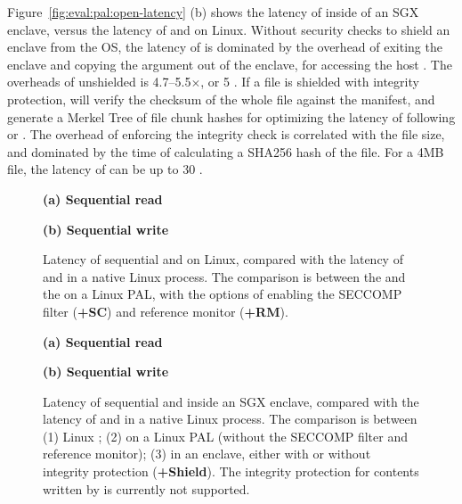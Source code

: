 Figure~\ref{fig:eval:pal:open-latency} (b) shows the latency of  inside of an SGX enclave, versus the latency of 
 and  on Linux.
Without security checks to shield an enclave from the OS,
the latency of  is dominated by the overhead of exiting the enclave and copying the argument out of the enclave,
for accessing the host \linuxapis{}.
The overheads of unshielded  is 4.7--5.5$\times$, or \roughly{}5 \usec{}.
If a file is shielded with integrity protection,
 will verify the checksum of the whole file against the manifest, and generate a Merkel Tree of file chunk hashes
for optimizing the latency of following  or .
The overhead of enforcing the integrity check is correlated with the file size, and dominated by the time of
calculating a SHA256 hash of the file.
For a 4MB file, the latency of  can be up to \roughly{}30 \msec{}.






\begin{figure*}[t!]
\centering
\footnotesize
{}
\parbox{0.49\textwidth}{\centering\bf (a) Sequential read}
\parbox{0.49\textwidth}{\centering\bf (b) Sequential write}
\caption{Latency of sequential  and  on Linux, compared with the latency of  and  \linuxapis{} in a native Linux process. The comparison is between the \linuxapis{} and the \hostapis{} on a Linux PAL,
with the options of enabling the SECCOMP filter ({\bf +SC})
and reference monitor ({\bf +RM}).}
\label{fig:eval:pal:read-write-latency}
\end{figure*}

\begin{figure*}[t!]
\centering
\footnotesize
{}
\parbox{0.49\textwidth}{\centering\bf (a) Sequential read}
\parbox{0.49\textwidth}{\centering\bf (b) Sequential write}
\caption{Latency of sequential  and  inside an SGX enclave, compared with the latency of  and  \linuxapis{} in a native Linux process. The comparison is between (1) Linux \linuxapis{}; (2) \hostapis{} on a Linux PAL (without the SECCOMP filter and reference monitor); (3) \hostapis{} in an enclave, either with or without integrity protection ({\bf +Shield}).
The integrity protection for contents written by 
is currently not supported.}
\label{fig:eval:pal:sgx-read-write-latency}
\end{figure*}


